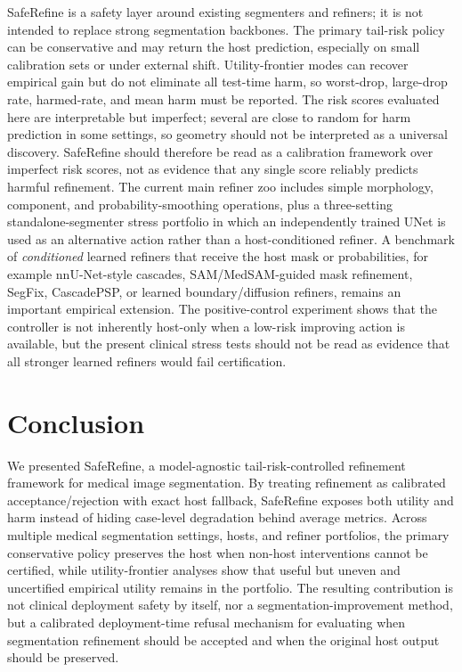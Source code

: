 \documentclass[preprint,12pt]{elsarticle}
\begin{document}
SafeRefine is a safety layer around existing segmenters and refiners; it is not
intended to replace strong segmentation backbones. The primary tail-risk policy
can be conservative and may return the host prediction, especially on small
calibration sets or under external shift. Utility-frontier modes can recover
empirical gain but do not eliminate all test-time harm, so worst-drop,
large-drop rate, harmed-rate, and mean harm must be reported. The risk scores
evaluated here are interpretable but imperfect; several are close to random for
harm prediction in some settings, so geometry should not be interpreted as a
universal discovery. SafeRefine should therefore be read as a calibration
framework over imperfect risk scores, not as evidence that any single score
reliably predicts harmful refinement. The current main refiner zoo includes
simple morphology, component, and probability-smoothing operations, plus a
three-setting standalone-segmenter stress portfolio in which an independently
trained UNet is used as an alternative action rather than a host-conditioned
refiner. A benchmark of \emph{conditioned} learned refiners that receive the
host mask or probabilities, for example nnU-Net-style cascades, SAM/MedSAM-guided
mask refinement, SegFix, CascadePSP, or learned boundary/diffusion refiners,
remains an important empirical extension. The
positive-control experiment shows that the controller is not inherently
host-only when a low-risk improving action is available, but the present
clinical stress tests should not be read as evidence that all stronger learned
refiners would fail certification.

\section{Conclusion}

We presented SafeRefine, a model-agnostic tail-risk-controlled refinement
framework for medical image segmentation. By treating refinement as calibrated
acceptance/rejection with exact host fallback, SafeRefine exposes both utility
and harm instead of hiding case-level degradation behind average metrics.
Across multiple medical segmentation settings, hosts, and refiner portfolios,
the primary conservative policy preserves the host when non-host interventions
cannot be certified, while utility-frontier analyses show that useful but
uneven and uncertified empirical utility remains in the portfolio. The
resulting contribution is not clinical deployment safety by itself, nor a
segmentation-improvement method, but a calibrated deployment-time refusal
mechanism for evaluating when segmentation refinement should be accepted and
when the original host output should be preserved.
\end{document}
